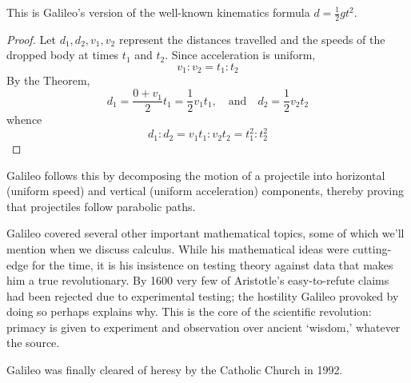 This is Galileo's version of the well-known kinematics formula $d=\frac 12gt^2$.

\begin{proof}
	Let $d_1,d_2,v_1,v_2$ represent the distances travelled and the speeds of the dropped body at times $t_1$ and $t_2$. Since acceleration is uniform,
	\[
		v_1:v_2=t_1:t_2
	\]
	By the Theorem,
	\[
		d_1=\frac{0+v_1}2t_1=\frac 12v_1t_1,
		\quad\text{and}\quad
		d_2=\frac 12v_2t_2
	\]
	whence
	\[
		d_1:d_2=v_1t_1:v_2t_2=t_1^2:t_2^2\tag*{\qedhere}
	\]
\end{proof}

Galileo follows this by decomposing the motion of a projectile into horizontal (uniform speed) and vertical (uniform acceleration) components, thereby proving that projectiles follow parabolic paths.\smallbreak

Galileo covered several other important mathematical topics, some of which we'll mention when we discuss calculus. While his mathematical ideas were cutting-edge for the time, it is his insistence on testing theory against data that makes him a true revolutionary. By 1600 very few of Aristotle's easy-to-refute claims had been rejected due to experimental testing; the hostility Galileo provoked by doing so perhaps explains why. This is the core of the scientific revolution: primacy is given to experiment and observation over ancient `wisdom,' whatever the source.\smallbreak

Galileo was finally cleared of heresy by the Catholic Church in 1992.



